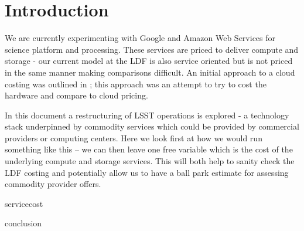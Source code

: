 \section{Introduction} \label{sec:intro}

We are currently experimenting with Google and Amazon Web Services for science platform and processing.
These services are priced to deliver compute and storage - our current model at the \gls{LDF} is also service oriented but
is not priced in the same manner making comparisons difficult.
An initial approach to a \gls{cloud} costing was outlined in ; this approach was an attempt to try to cost the hardware and compare to \gls{cloud} pricing.

In this document a restructuring of \gls{LSST} operations is explored - a technology \gls{stack} underpinned by commodity services which could be provided by commercial providers or computing centers. Here we look first at how we would run something like this -- we can then leave one free variable which is the cost of the underlying compute and storage services. This will both help to
sanity check the \gls{LDF} costing and potentially allow us to have a ball park estimate for assessing commodity provider offers.



 {servicecost}


 {conclusion}
